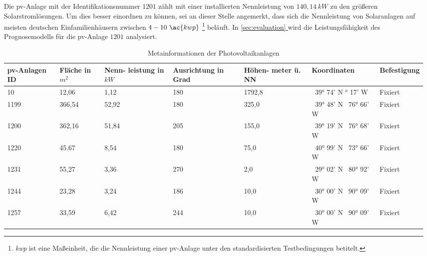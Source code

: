 \documentclass[12pt, a4paper]{article}
\newcommand*{\fullref}[1]{\hyperref[{#1}]{\autoref*{#1} \textit{\nameref*{#1}}}}
\begin{document}
Die \ac{pv}-Anlage mit der Identifikationsnummer $1201$ zählt mit einer installierten Nennleistung von $140,14 \ kW$ zu den größeren Solarstromlösungen. Um dies besser einordnen zu können, sei an dieser Stelle angemerkt, dass sich die Nennleistung von Solaranlagen auf meisten deutschen Einfamilienhäusern zwischen $4 - 10 \ \ac{kwp}$ \footnote{\textit{\ac{kwp}} ist eine Maßeinheit, die die Nennleistung einer \ac{pv}-Anlage unter den standardisierten Testbedingungen betitelt.} beläuft. In \fullref{sec:evaluation} wird die Leistungsfähigkeit des Prognosemodells für die \ac{pv}-Anlage $1201$ analysiert.


\begin{table}
\begin{center}
\begin{tabular}{| p{1.5cm} | p{1.5cm} | p{1.5cm} | p{2.3cm}  | p{2cm} | p{2.2cm} | p{2cm} |}
\hline
\ac{pv}-Anlagen ID & Fläche in $m^2$ & Nenn- leistung in $kW$ & Ausrichtung in Grad & Höhen- meter ü. NN & Koordinaten & Befestigung \\ \hline
  10 &  12,06 &   1,12 & 180 & 1792,8 & \ 39° 74' N \newline   105° 17' W & Fixiert \\ \hline
1199 & 366,54 &  52,92 & 180 &  325,0 & \ 39° 48' N \newline \  76° 66' W & Fixiert \\ \hline
1200 & 362,16 &  51,84 & 205 &  155,0 & \ 39° 19' N \newline \  76° 68' W & Fixiert \\ \hline
1220 &  45.67 &   8,54 & 180 &   75,0 & \ 40° 99' N \newline \  73° 66' W & Fixiert \\ \hline
1231 &  55,27 &   3,36 & 270 &    2,0 & \ 29° 02' N \newline \  80° 92' W & Fixiert \\ \hline
1244 &  23,28 &   3,24 & 186 &   10,0 & \ 30° 00' N \newline \  90° 09' W & Fixiert \\ \hline
1257 &  33,59 &   6,42 & 244 &   10,0 & \ 30° 00' N \newline \  90° 09' W & Fixiert \\ \hline

\end{tabular}
\end{center}
\caption{Metainformationen der Photovoltaikanlagen}
\label{tab:solarsystem_metadata} 
\end{table}
\end{document}

